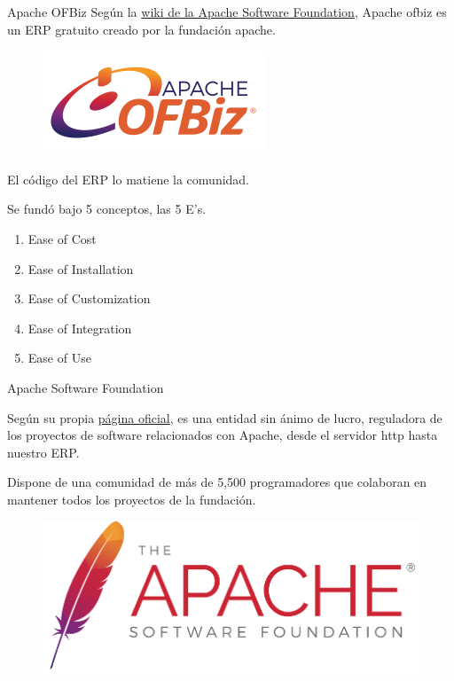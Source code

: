 \begin{frame}{Apache OFBiz}
Según la \href{https://cwiki.apache.org/confluence/display/OFBIZ/Philosophy}{wiki de la Apache Software Foundation}, Apache ofbiz es un ERP gratuito creado por la fundación apache.

	\begin{figure}[H]
	\centering
	\includegraphics[width=0.4\linewidth]{img/1.png}
\end{figure}

El código del ERP lo matiene la comunidad.

Se fundó bajo 5 conceptos, las 5 E's.

\begin{enumerate}
	\item Ease of Cost
	\item Ease of Installation
	\item Ease of Customization
	\item Ease of Integration
	\item Ease of Use
\end{enumerate}

\end{frame}


\begin{frame}{Apache Software Foundation}

Según su propia \href{https://www.apache.org/foundation/}{página oficial}, es una entidad sin ánimo de lucro, reguladora de los proyectos de software relacionados con Apache, desde el servidor http hasta nuestro ERP.
\vspace{.5cm}

Dispone de una comunidad de más de 5,500 programadores que colaboran en mantener todos los proyectos de la fundación.

\begin{figure}[H]
	\centering
	\includegraphics[width=0.5\linewidth]{img/2.png}
\end{figure}
\end{frame}
